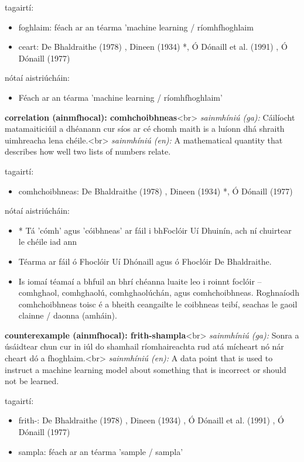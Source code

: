 \documentclass{article}
\begin{document}
tagairtí:
\begin{itemize}
	\item foghlaim: féach ar an téarma 'machine learning / ríomhfhoghlaim
	\item ceart: De Bhaldraithe (1978) \cite{de-bhaldraithe}, Dineen (1934) \cite{dineen}*, Ó Dónaill et al. (1991) \cite{focloir-beag}, Ó Dónaill (1977) \cite{odonaill}
\end{itemize}

nótaí aistriúcháin:
\begin{itemize}
	\item Féach ar an téarma 'machine learning / ríomhfhoghlaim'
\end{itemize}


\textbf{correlation (ainmfhocal): comhchoibhneas}<br>
\textit{sainmhíniú (ga):} Cáilíocht matamaiticiúil a dhéanann cur síos ar cé chomh maith is a luíonn dhá shraith uimhreacha lena chéile.<br>
\textit{sainmhíniú (en):} A mathematical quantity that describes how well two lists of numbers relate.

tagairtí:
\begin{itemize}
	\item comhchoibhneas: De Bhaldraithe (1978) \cite{de-bhaldraithe}, Dineen (1934) \cite{dineen}*, Ó Dónaill (1977) \cite{odonaill}
\end{itemize}

nótaí aistriúcháin:
\begin{itemize}
	\item * Tá 'cómh' agus 'cóibhneas' ar fáil i bhFoclóir Uí Dhuinín, ach ní chuirtear le chéile iad ann
	\item Téarma ar fáil ó Fhoclóir Uí Dhónaill agus ó Fhoclóir De Bhaldraithe.
	\item Is iomaí téamaí a bhfuil an bhrí chéanna luaite leo i roinnt foclóir -- comhghaol, comhghaolú, comhghaolúchán, agus comhchoibhneas. Roghnaíodh comhchoibhneas toisc é a bheith ceangailte le coibhneas teibí, seachas le gaoil clainne / daonna (amháin).
\end{itemize}


\textbf{counterexample (ainmfhocal): frith-shampla}<br>
\textit{sainmhíniú (ga):} Sonra a úsáidtear chun cur in iúl do shamhail ríomhaireachta rud atá mícheart nó nár cheart dó a fhoghlaim.<br>
\textit{sainmhíniú (en):} A data point that is used to instruct a machine learning model about something that is incorrect or should not be learned.

tagairtí:
\begin{itemize}
	\item frith-: De Bhaldraithe (1978) \cite{de-bhaldraithe}, Dineen (1934) \cite{dineen}, Ó Dónaill et al. (1991) \cite{focloir-beag}, Ó Dónaill (1977) \cite{odonaill}
	\item sampla: féach ar an téarma 'sample / sampla'
\end{itemize}
\end{document}
